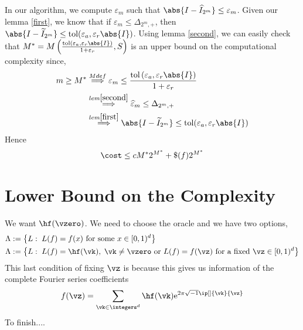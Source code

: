 \documentclass[]{elsarticle}
\theoremstyle{definition}
\newcommand{\cube}{[0,1)^d}
\newcommand{\tol}{\text{tol}}
\newcommand{\e}{\text{e}}
\begin{document}
In our algorithm, we compute ${\varepsilon}_m$ such that $\abs{I-\widehat{I}_{2^m}}\leq {\varepsilon}_m$. Given our lemma \eqref{first}, we know that if ${\varepsilon}_m\leq \Delta_{2^m,+}$, then $\abs{I-\widetilde{I}_{2^m}}\leq \tol(\varepsilon_a,\varepsilon_r\abs{I})$. Using lemma \eqref{second}, we can easily check that $M^*=M\left(\frac{\tol\left(\varepsilon_a,\varepsilon_r\abs{I}\right)}{1+\varepsilon_r},S\right)$ is an upper bound on the computational complexity since,
\begin{align*}
m\geq M^*&\stackrel{M def}{\Longrightarrow} {\varepsilon}_m\leq\frac{\tol\left(\varepsilon_a,\varepsilon_r\abs{I}\right)}{1+\varepsilon_r}\\
&\stackrel{lem \eqref{second}}{\Longrightarrow}\widehat{\varepsilon}_m\leq \Delta_{2^m,+}\\
&\stackrel{lem \eqref{first}}{\Longrightarrow} \abs{I-\widetilde{I}_{2^m}}\leq \tol(\varepsilon_a,\varepsilon_r\abs{I})
\end{align*}
Hence
\[
\cost \leq cM^*2^{M^*}+\$(f)2^{M^*}
\]

\section{Lower Bound on the Complexity}
We want $\hf(\vzero)$. We need to choose the oracle and we have two options,
\begin{align*}
&\Lambda:=\left\{L:\; L(f)=f(x)\text{ for some }x\in\cube\right\}\\
&\Lambda:=\left\{L:\; L(f)=\hf(\vk),\;\vk\neq\vzero\text{ or }L(f)=f(\vz)\text{ for a fixed }\vz\in\cube\right\}\\
\end{align*}
This last condition of fixing $\vz$ is because this gives us information of the complete Fourier series coefficients
\[
f(\vz)=\sum_{\vk\in\integers^d}\hf(\vk)\e^{2\pi\sqrt{-1}\ip[]{\vk}{\vz}}
\]
To finish....
\end{document}
